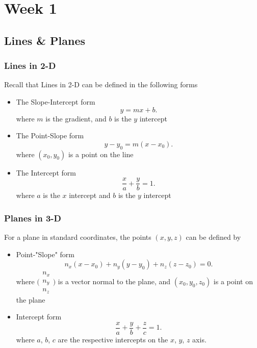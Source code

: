 \chapter{Week 1}

\section{Lines \& Planes}

\subsection{Lines in 2-D}

\begin{framed}
Recall that Lines in 2-D can be defined in the following forms
   \begin{itemize}
      \item The Slope-Intercept form \[
      y = mx + b
      .\] 
      where $m$ is the gradient, and $b$ is the $y$ intercept
      \item The Point-Slope form \[
      y - y_0 = m(x-x_0)
      .\]   
      where $(x_0, y_0)$ is a point on the line
      \item The Intercept form \[
      \frac{x}{a} + \frac{y}{b} = 1
      .\]  where $a$ is the $x$ intercept and $b$ is the $y$ intercept
   \end{itemize}
\end{framed}

\subsection{Planes in 3-D}
\begin{framed}
   For a plane in standard coordinates, the points $(x, y, z)$ can be defined by
   \begin{itemize}
      \item Point-"Slope" form \[
        n_x(x-x_0) + n_y(y-y_0) + n_z(z - z_0) = 0
      .\] where $ \big(\begin{smallmatrix}
        n_x \\ 
        n_y \\
        n_z
      \end{smallmatrix} \big)$
      is a vector normal to the plane, and $(x_0, y_0, z_0)$ is a point on the plane

   \item Intercept form \[
     \frac{x}{a} + \frac{y}{b} + \frac{z}{c} = 1
   .\] where $a$,  $b$, $c$ are the respective intercepts on the $x$, $y$, $z$ axis.

   \end{itemize}
\end{framed}




